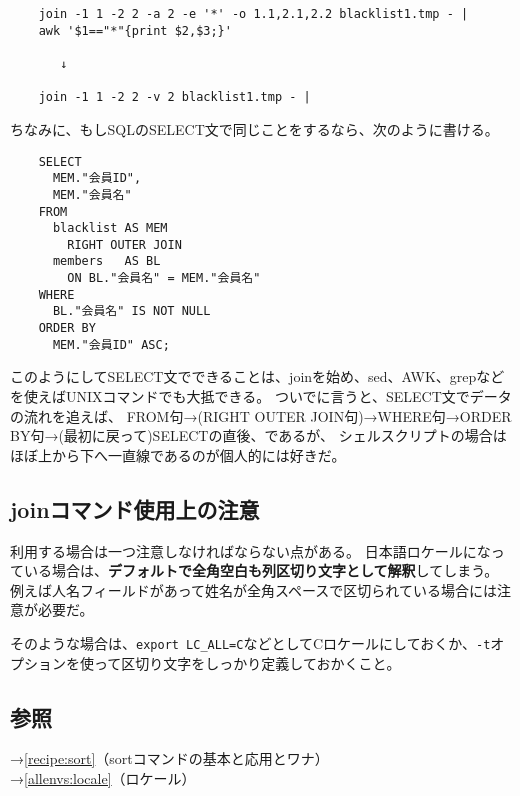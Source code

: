 \begin{verbatim}
	join -1 1 -2 2 -a 2 -e '*' -o 1.1,2.1,2.2 blacklist1.tmp - |
	awk '$1=="*"{print $2,$3;}'

	   ↓

	join -1 1 -2 2 -v 2 blacklist1.tmp - |
\end{verbatim}

ちなみに、もしSQLのSELECT文で同じことをするなら、次のように書ける。

\begin{verbatim}
	SELECT
	  MEM."会員ID",
	  MEM."会員名"
	FROM
	  blacklist AS MEM
	    RIGHT OUTER JOIN
	  members   AS BL
	    ON BL."会員名" = MEM."会員名"
	WHERE
	  BL."会員名" IS NOT NULL
	ORDER BY
	  MEM."会員ID" ASC;
\end{verbatim}

このようにしてSELECT文でできることは、joinを始め、sed、AWK、grepなどを使えばUNIXコマンドでも大抵できる。
ついでに言うと、SELECT文でデータの流れを追えば、
FROM句→(RIGHT OUTER JOIN句)→WHERE句→ORDER BY句→(最初に戻って)SELECTの直後、であるが、
シェルスクリプトの場合はほぼ上から下へ一直線であるのが個人的には好きだ。

\subsection*{joinコマンド使用上の注意}

利用する場合は一つ注意しなければならない点がある。
日本語ロケールになっている場合は、\textbf{デフォルトで全角空白も列区切り文字として解釈}してしまう。
例えば人名フィールドがあって姓名が全角スペースで区切られている場合には注意が必要だ。

そのような場合は、\verb|export LC_ALL=C|などとしてCロケールにしておくか、\verb|-t|オプションを使って区切り文字をしっかり定義しておかくこと。


\subsection*{参照}

\noindent
→\ref{recipe:sort}（sortコマンドの基本と応用とワナ） \\
→\ref{allenvs:locale}（ロケール）
